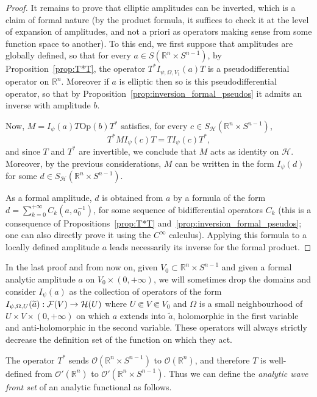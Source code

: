 \documentclass[AHL,Unicode,longabstracts,published]{cedram}
\newcommand{\Opp}{\mathrm{Op}}
\newcommand{\clO}{\mathcal{O}}
\newcommand{\clF}{\mathcal{F}}
\newcommand{\clH}{\mathcal{H}}
\newcommand\1{\mathds{1}}
\newcommand{\R}{\mathbb{R}}
\renewcommand*{\to}{\mathchoice{\longrightarrow}{\rightarrow}{\rightarrow}{\rightarrow}}
\begin{document}
\begin{proof}
It remains to prove that elliptic amplitudes can be inverted, which is a claim of formal nature (by the product formula, it suffices to check it at the level of expansion of amplitudes, and not a priori as operators making sense from some function space to another). To this end, we first suppose that amplitudes are globally defined, so that for every $a\in S(\R^n\times S^{n-1})$, by Proposition~\ref{prop:T*T}, the operator $T^*I_{\psi,\Omega,V_1}(a)T$ is a pseudodifferential operator on $\R^n$. Moreover if $a$ is elliptic then so is this pseudodifferential operator, so that by Proposition~\ref{prop:inversion_formal_pseudos} it admits an inverse with amplitude $b$.

Now, $M=I_{\psi}(a)T\Opp(b)T^*$ satisfies, for every $c\in S_{\clH}(\R^n\times S^{n-1})$,
\[
T^*MI_{\psi}(c)T=TI_{\psi}(c)T^*,
\]
and since $T$ and $T^*$ are invertible, we conclude that $M$ acts as identity on $\clH$. Moreover, by the previous considerations, $M$ can be written in the form $I_{\psi}(d)$ for some $d\in S_{\clH}(\R^n\times S^{n-1})$.

As a formal amplitude, $d$ is obtained from $a$ by a formula of the form $d=\sum_{k=0}^{+\infty}C_k(a,a_0^{-1})$, for some sequence of bidifferential operators $C_k$ (this is a consequence of Propositions~\ref{prop:T*T} and~\ref{prop:inversion_formal_pseudos}; one can also directly prove it using the $C^{\infty}$ calculus). Applying this formula to a locally defined amplitude $a$ leads necessarily its inverse for the formal product.
\end{proof}

In the last proof and from now on, given $V_0\subset \R^n\times S^{n-1}$ and given a formal analytic amplitude $a$ on $V_0\times (0,+\infty)$, we will sometimes drop the domains and consider $I_{\psi}(a)$ as the collection of operators of the form $I_{\psi,\Omega,U}(\widetilde{a}):\clF(V)\to \clH(U)$ where $U\Subset V\Subset V_0$ and $\Omega$ is a small neighbourhood of $U\times V\times (0,+\infty)$ on which $a$ extends into $\widetilde{a}$, holomorphic in the first variable and anti-holomorphic in the second variable. These operators will always strictly decrease the definition set of the function on which they act.



The operator $T^*$ sends $\clO(\R^n\times S^{n-1})$ to $\clO(\R^n)$, and therefore $T$ is well-defined from $\clO'(\R^n)$ to $\clO'(\R^n\times S^{n-1})$. Thus we can define the \emph{analytic wave front set} of an analytic functional as follows.
\end{document}

